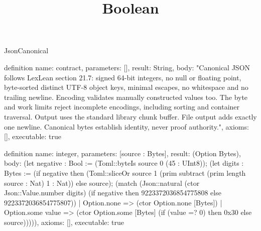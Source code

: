 \begin{lexlean}{JsonCanonical}
\title{Boolean}
\begin{semanticmodule}

definition{
  name: contract,
  parameters: [],
  result: String,
  body: "Canonical JSON follows LexLean section 21.7: signed 64-bit integers, no null or floating point, byte-sorted distinct UTF-8 object keys, minimal escapes, no whitespace and no trailing newline. Encoding validates manually constructed values too. The byte and work limits reject incomplete encodings, including sorting and container traversal. Output uses the standard library chunk buffer. File output adds exactly one newline. Canonical bytes establish identity, never proof authority.",
  axioms: [],
  executable: true
}

definition{
  name: integer,
  parameters: [source : Bytes],
  result: (Option Bytes),
  body: (let negative : Bool := (Toml::byteIs source 0 (45 : UInt8)); (let digits : Bytes := (if negative then (Toml::sliceOr source 1 (prim subtract (prim length source : Nat) 1 : Nat)) else source); (match (Json::natural (ctor Json::Value.number digits) (if negative then 9223372036854775808 else 9223372036854775807)) | Option.none => (ctor Option.none [Bytes]) | Option.some value => (ctor Option.some [Bytes] (if (value =? 0) then 0x30 else source))))),
  axioms: [],
  executable: true
}


\end{semanticmodule}
\end{lexlean}
